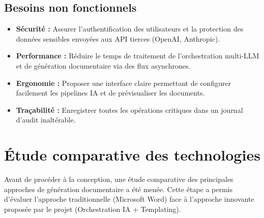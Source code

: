 \documentclass[12pt, a4paper]{report}
\begin{document}
\subsection{Besoins non fonctionnels}
\begin{itemize}
    \item \textbf{Sécurité :} Assurer l’authentification des utilisateurs et la protection des données sensibles envoyées aux API tierces (OpenAI, Anthropic).
    \item \textbf{Performance :} Réduire le temps de traitement de l'orchestration multi-LLM et de génération documentaire via des flux asynchrones.
    \item \textbf{Ergonomie :} Proposer une interface claire permettant de configurer facilement les pipelines IA et de prévisualiser les documents.
    \item \textbf{Traçabilité :} Enregistrer toutes les opérations critiques dans un journal d’audit inaltérable.
\end{itemize}

\section{Étude comparative des technologies}
Avant de procéder à la conception, une étude comparative des principales approches de génération documentaire a été menée. Cette étape a permis d’évaluer l'approche traditionnelle (Microsoft Word) face à l'approche innovante proposée par le projet (Orchestration IA + Templating).
\end{document}

